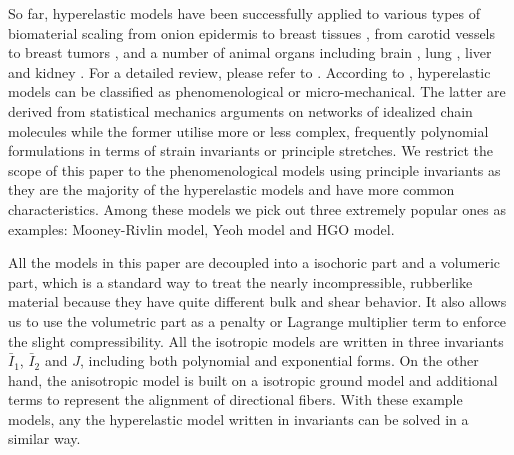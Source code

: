 So far, hyperelastic models have been successfully applied to various types of biomaterial scaling from onion epidermis \cite{Qian} to breast tissues \cite{OHagen}, from carotid vessels \cite{Zidi, Zidi2, Bols} to breast tumors \cite{Oberai}, and a number of animal organs including brain \cite{Karimi, Samani, Gilchrist}, lung  \cite{Wall, Wall2}, liver and kidney \cite{Fu, Untaroiu, Willinger}. For a detailed review, please refer to \cite{Kupriyanova}.
According to \cite{Steinmann}, hyperelastic models can be classified as phenomenological or micro-mechanical. The latter are derived from statistical mechanics arguments on networks of idealized chain molecules while the former utilise more or less complex, frequently polynomial formulations in terms of strain invariants or principle stretches. We restrict the scope of this paper to the phenomenological models using principle invariants as they are the majority of the hyperelastic models and have more common characteristics. Among these models we pick out three extremely popular ones as examples: Mooney-Rivlin model, Yeoh model and HGO model.

All the models in this paper are decoupled into a isochoric part and a volumeric part, which is a standard way to treat the nearly incompressible, rubberlike material because they have quite different bulk and shear behavior. It also allows us to use the volumetric part as a penalty or Lagrange multiplier term to enforce the slight compressibility. All the isotropic models are written in three invariants $\bar{I}_1$, $\bar{I}_2$ and $J$, including both polynomial and exponential forms. On the other hand, the anisotropic model is built on a isotropic ground model and additional terms to represent the alignment of directional fibers. With these example models, any the hyperelastic model written in invariants can be solved in a similar way.

